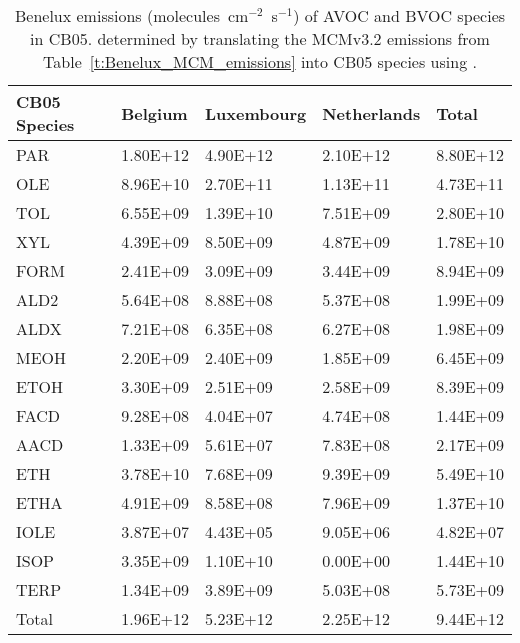 \footnotesize
\begin{table}
    \centering
    \caption{Benelux emissions (molecules~cm$^{-2}$~s$^{-1}$) of AVOC and BVOC species in CB05. determined by translating the MCMv3.2 emissions from Table~\ref{t:Benelux_MCM_emissions} into CB05 species using \citet{Yarwood:2005}.}%
\begin{tabular}{lllll}
	\hline \hline
	\textbf{CB05 Species} & \textbf{Belgium} & \textbf{Luxembourg} & \textbf{Netherlands} & \textbf{Total} \\ 
	\hline
	PAR & 1.80E+12 & 4.90E+12 & 2.10E+12 & 8.80E+12 \\
	OLE & 8.96E+10 & 2.70E+11 & 1.13E+11 & 4.73E+11 \\
	TOL & 6.55E+09 & 1.39E+10 & 7.51E+09 & 2.80E+10 \\
	XYL & 4.39E+09 & 8.50E+09 & 4.87E+09 & 1.78E+10 \\
	FORM & 2.41E+09 & 3.09E+09 & 3.44E+09 & 8.94E+09 \\
	ALD2 & 5.64E+08 & 8.88E+08 & 5.37E+08 & 1.99E+09 \\
	ALDX & 7.21E+08 & 6.35E+08 & 6.27E+08 & 1.98E+09 \\
	MEOH & 2.20E+09 & 2.40E+09 & 1.85E+09 & 6.45E+09 \\
	ETOH & 3.30E+09 & 2.51E+09 & 2.58E+09 & 8.39E+09 \\
	FACD & 9.28E+08 & 4.04E+07 & 4.74E+08 & 1.44E+09 \\
	AACD & 1.33E+09 & 5.61E+07 & 7.83E+08 & 2.17E+09 \\
	ETH & 3.78E+10 & 7.68E+09 & 9.39E+09 & 5.49E+10 \\
	ETHA & 4.91E+09 & 8.58E+08 & 7.96E+09 & 1.37E+10 \\
	IOLE & 3.87E+07 & 4.43E+05 & 9.05E+06 & 4.82E+07 \\
	ISOP & 3.35E+09 & 1.10E+10 & 0.00E+00 & 1.44E+10 \\
	TERP & 1.34E+09 & 3.89E+09 & 5.03E+08 & 5.73E+09 \\
	\hline Total & 1.96E+12 & 5.23E+12 & 2.25E+12 & 9.44E+12 \\
	\hline \hline
\end{tabular}
\label{t:CB05_NMVOC_emissions}
\end{table}
